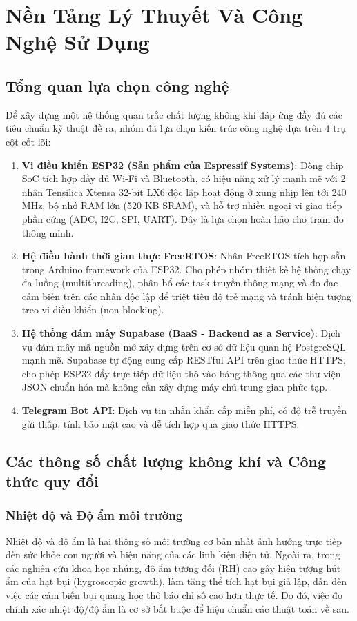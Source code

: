 \chapter{Nền Tảng Lý Thuyết Và Công Nghệ Sử Dụng}

\section{Tổng quan lựa chọn công nghệ}
Để xây dựng một hệ thống quan trắc chất lượng không khí đáp ứng đầy đủ các tiêu chuẩn kỹ thuật đề ra, nhóm đã lựa chọn kiến trúc công nghệ dựa trên 4 trụ cột cốt lõi:
\begin{enumerate}
    \item \textbf{Vi điều khiển ESP32 (Sản phẩm của Espressif Systems)}: Dòng chip SoC tích hợp đầy đủ Wi-Fi và Bluetooth, có hiệu năng xử lý mạnh mẽ với 2 nhân Tensilica Xtensa 32-bit LX6 độc lập hoạt động ở xung nhịp lên tới 240 MHz, bộ nhớ RAM lớn (520 KB SRAM), và hỗ trợ nhiều ngoại vi giao tiếp phần cứng (ADC, I2C, SPI, UART). Đây là lựa chọn hoàn hảo cho trạm đo thông minh.
    \item \textbf{Hệ điều hành thời gian thực FreeRTOS}: Nhân FreeRTOS tích hợp sẵn trong Arduino framework của ESP32. Cho phép nhóm thiết kế hệ thống chạy đa luồng (multithreading), phân bổ các task truyền thông mạng và đo đạc cảm biến trên các nhân độc lập để triệt tiêu độ trễ mạng và tránh hiện tượng treo vi điều khiển (non-blocking).
    \item \textbf{Hệ thống đám mây Supabase (BaaS - Backend as a Service)}: Dịch vụ đám mây mã nguồn mở xây dựng trên cơ sở dữ liệu quan hệ PostgreSQL mạnh mẽ. Supabase tự động cung cấp RESTful API trên giao thức HTTPS, cho phép ESP32 đẩy trực tiếp dữ liệu thô vào bảng thông qua các thư viện JSON chuẩn hóa mà không cần xây dựng máy chủ trung gian phức tạp.
    \item \textbf{Telegram Bot API}: Dịch vụ tin nhắn khẩn cấp miễn phí, có độ trễ truyền gửi thấp, tính bảo mật cao và dễ tích hợp qua giao thức HTTPS.

\end{enumerate}

\section{Các thông số chất lượng không khí và Công thức quy đổi}
\subsection{Nhiệt độ và Độ ẩm môi trường}
Nhiệt độ và độ ẩm là hai thông số môi trường cơ bản nhất ảnh hưởng trực tiếp đến sức khỏe con người và hiệu năng của các linh kiện điện tử. Ngoài ra, trong các nghiên cứu khoa học nhúng, độ ẩm tương đối (RH) cao gây hiện tượng hút ẩm của hạt bụi (hygroscopic growth), làm tăng thể tích hạt bụi giả lập, dẫn đến việc các cảm biến bụi quang học thô báo chỉ số cao hơn thực tế. Do đó, việc đo chính xác nhiệt độ/độ ẩm là cơ sở bắt buộc để hiệu chuẩn các thuật toán về sau.

